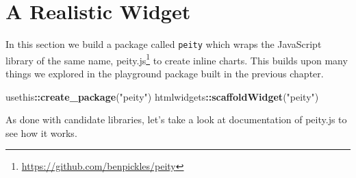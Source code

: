 \documentclass[
]{krantz}
\makeatletter
\newenvironment{Shaded}{\begin{snugshade}}{\end{snugshade}}
\newcommand{\CommentTok}[1]{\textcolor[rgb]{0.37,0.37,0.37}{\textit{#1}}}
\newcommand{\DataTypeTok}[1]{\textcolor[rgb]{0.27,0.27,0.27}{#1}}
\newcommand{\FunctionTok}[1]{\textcolor[rgb]{0,0,0}{#1}}
\newcommand{\KeywordTok}[1]{\textcolor[rgb]{0.27,0.27,0.27}{\textbf{#1}}}
\newcommand{\NormalTok}[1]{#1}
\newcommand{\OperatorTok}[1]{\textcolor[rgb]{0.43,0.43,0.43}{\textbf{#1}}}
\newcommand{\OtherTok}[1]{\textcolor[rgb]{0.37,0.37,0.37}{#1}}
\newcommand{\StringTok}[1]{\textcolor[rgb]{0.5,0.5,0.5}{#1}}
\renewcommand{\href}[2]{#2\footnote{\url{#1}}}
\newenvironment{kframe}{%
\medskip{}
\setlength{\fboxsep}{.8em}
 \def\at@end@of@kframe{}%
 \ifinner\ifhmode%
  \def\at@end@of@kframe{\end{minipage}}%
  \begin{minipage}{\columnwidth}%
 \fi\fi%
 \def\FrameCommand##1{\hskip\@totalleftmargin \hskip-\fboxsep
 \colorbox{shadecolor}{##1}\hskip-\fboxsep
     \hskip-\linewidth \hskip-\@totalleftmargin \hskip\columnwidth}%
 \MakeFramed {\advance\hsize-\width
   \@totalleftmargin\z@ \linewidth\hsize
   \@setminipage}}%
 {\par\unskip\endMakeFramed%
 \at@end@of@kframe}
\renewenvironment{Shaded}{\begin{kframe}}{\end{kframe}}
\makeatother
\begin{document}
\hypertarget{widgets-realistic}{%
\chapter{A Realistic Widget}\label{widgets-realistic}}

In this section we build a package called \texttt{peity} which wraps the JavaScript library of the same name, \href{https://github.com/benpickles/peity}{peity.js} to create inline charts. This builds upon many things we explored in the playground package built in the previous chapter.

\begin{Shaded}
\begin{Highlighting}[]
\NormalTok{usethis}\OperatorTok{::}\KeywordTok{create\_package}\NormalTok{(}\StringTok{"peity"}\NormalTok{)}
\NormalTok{htmlwidgets}\OperatorTok{::}\KeywordTok{scaffoldWidget}\NormalTok{(}\StringTok{"peity"}\NormalTok{)}
\end{Highlighting}
\end{Shaded}

As done with candidate libraries, let's take a look at documentation of peity.js to see how it works.

\begin{Shaded}
\end{Shaded}
\end{document}
